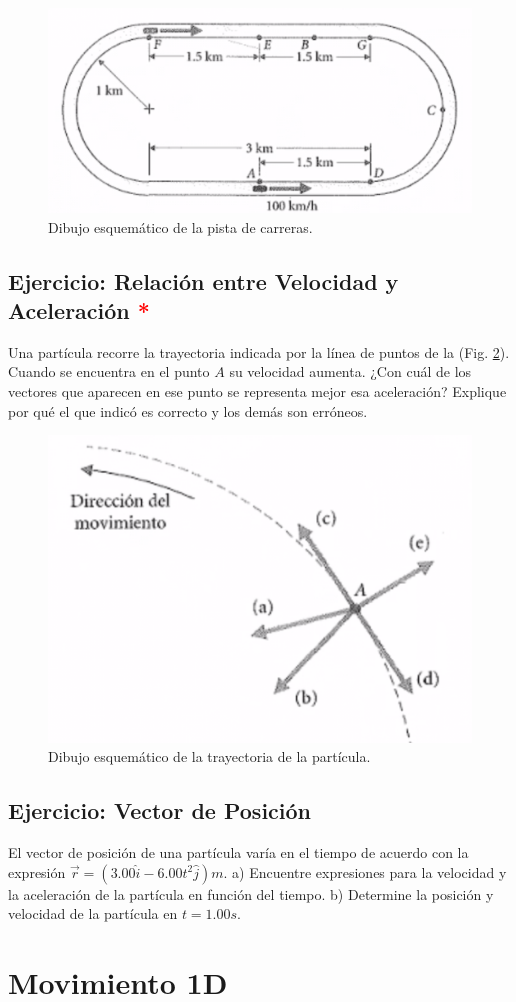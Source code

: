 \documentclass{replab}
\begin{document}
	\begin{figure}[htbp]
		\centering
		\includegraphics[width=.4\columnwidth]{imagenes/pista.png}
		\caption{Dibujo esquemático de la pista de carreras.}
		\label{fig:pista}
	\end{figure}

	\subsection{Ejercicio: Relación entre Velocidad y Aceleración \textcolor{red}{*}}
	Una partícula recorre la trayectoria indicada por la línea de puntos de la (Fig. \ref{fig:trayectoria}). Cuando se encuentra en el punto $A$ su velocidad aumenta. ¿Con cuál de los vectores que aparecen en ese punto se representa mejor esa aceleración? Explique por qué el que indicó es correcto y los demás son erróneos. 

	\begin{figure}[htbp]
		\centering
		\includegraphics[width=.4\columnwidth]{imagenes/trayectoria.png}
		\caption{Dibujo esquemático de la trayectoria de la partícula.}
		\label{fig:trayectoria}
	\end{figure}

	\subsection{Ejercicio: Vector de Posición}
	El vector de posición de una partícula varía en el tiempo de acuerdo con la expresión $\vec{r} = (3.00\hat{i} - 6.00t^2\hat{j})m$. a) Encuentre expresiones para la velocidad y la aceleración de la partícula en función del tiempo. b) Determine la posición y velocidad de la partícula en $t = 1.00s$.  

	\section{Movimiento 1D}
\end{document}
